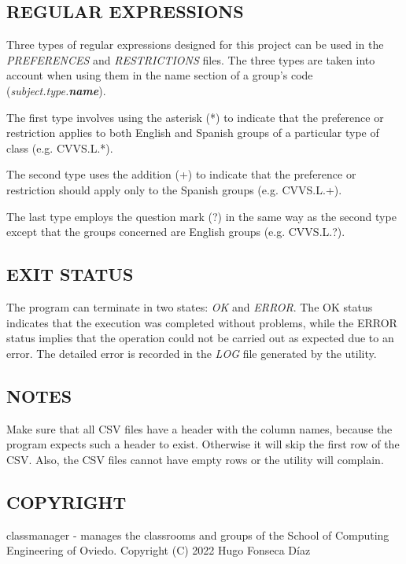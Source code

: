 \subsection*{REGULAR EXPRESSIONS}

Three types of regular expressions designed for this project can be used in the \textit{PREFERENCES} and \textit{RESTRICTIONS} files. The three types are taken into account when using them in the name section of a group's code (\textit{subject.type.\textbf{name}}).

The first type involves using the asterisk (*) to indicate that the preference or restriction applies to both English and Spanish groups of a particular type of class (e.g. CVVS.L.*).

The second type uses the addition (+) to indicate that the preference or restriction should apply only to the Spanish groups (e.g. CVVS.L.+).

The last type employs the question mark (?) in the same way as the second type except that the groups concerned are English groups (e.g. CVVS.L.?).


\subsection*{EXIT STATUS}

The program can terminate in two states: \textit{OK} and \textit{ERROR}. The OK status indicates that the execution was completed without problems, while the ERROR status implies that the operation could not be carried out as expected due to an error. The detailed error is recorded in the \textit{LOG} file generated by the utility.


\subsection*{NOTES}

Make sure that all CSV files have a header with the column names, because the program expects such a header to exist. Otherwise it will skip the first row of the CSV. Also, the CSV files cannot have empty rows or the utility will complain.


\subsection*{COPYRIGHT}

classmanager - manages the classrooms and groups of the School of Computing Engineering of Oviedo.
Copyright (C) 2022  Hugo Fonseca Díaz

